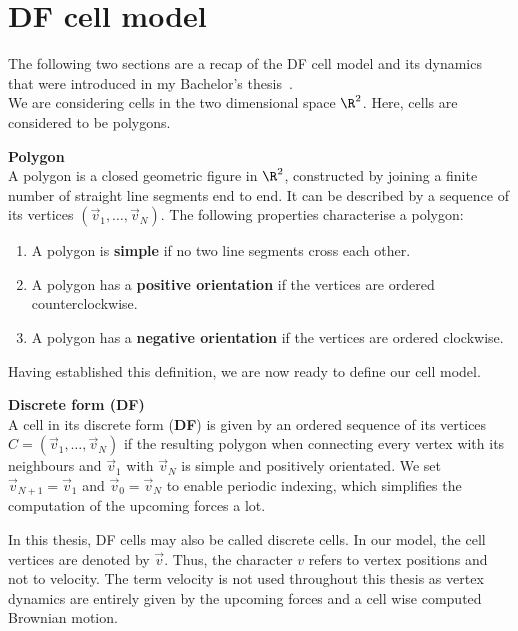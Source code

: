 \section{DF cell model} \label{model}

The following two sections are a recap of the DF cell model and its dynamics that were introduced in my Bachelor's thesis~\cite{Vogel2023}. \\
We are considering cells in the two dimensional space $\R^2$. Here, cells are considered to be polygons. 

\begin{definition} \textbf{Polygon} \\
	A polygon is a closed geometric figure in $\R^2$, constructed by joining a finite number of straight line segments end to end. 
	It can be described by a sequence of its vertices $(\vec{v}_1, \ldots, \vec{v}_N)$.
	The following properties characterise a polygon:
	\begin{enumerate}
		\item A polygon is \textbf{simple} if no two line segments cross each other. 
		\item A polygon has a \textbf{positive orientation} if the vertices are ordered counterclockwise.
		\item A polygon has a \textbf{negative orientation} if the vertices are ordered clockwise.
	\end{enumerate}
\end{definition}

Having established this definition, we are now ready to define our cell model.

\begin{definition} \textbf{Discrete form (DF)} \label{def:DF}  \\
	A cell in its discrete form (\textbf{DF}) is given by an ordered sequence of its vertices $C = (\vec{v}_1, \ldots , \vec{v}_N)$ if the resulting polygon when connecting every vertex with its neighbours and $\vec{v}_1$ with $\vec{v}_N$  is simple and positively orientated. 
	We set $\vec{v}_{N+1} = \vec{v}_{1}$ and $\vec{v}_{0} = \vec{v}_{N}$ to enable periodic indexing, which simplifies the computation of the upcoming forces a lot.
\end{definition}

In this thesis, DF cells may also be called discrete cells. 
In our model, the cell vertices are denoted by $\vec{v}$. 
Thus, the character $v$ refers to vertex positions and not to velocity.
The term velocity is not used throughout this thesis as vertex dynamics are entirely given by the upcoming forces and a cell wise computed Brownian motion. \\



